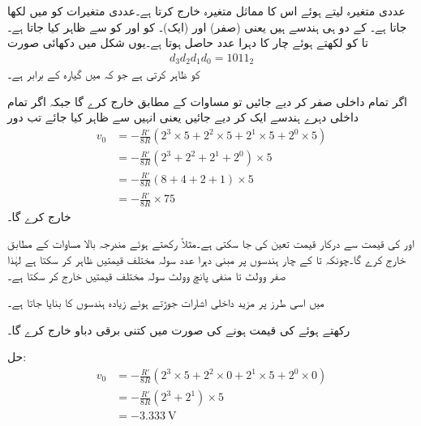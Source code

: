  عددی متغیرہ لیتے ہوئے اس کا مماثل متغیرہ خارج کرتا ہے۔عددی متغیرات کو   میں لکھا جاتا ہے۔ کے دو ہی ہندسے ہیں یعنی  (صفر) اور  (ایک)۔ کو  اور  کو  سے ظاہر کیا جاتا ہے۔ تا  کو  لکھتے ہوئے چار  کا دہرا عدد حاصل ہوتا ہے۔یوں شکل میں دکھائی صورت
\begin{align*}
d_3 d_2 d_1 d_0 =1011_2
\end{align*}
کو ظاہر کرتی ہے جو کہ  میں  گیارہ  کے برابر ہے۔

اگر تمام داخلی  صفر کر دیے جائیں تو  مساوات  کے مطابق   خارج کرے گا جبکہ اگر تمام داخلی دہرے ہندسے ایک کر دیے جائیں یعنی انہیں  سے ظاہر کیا جائے تب دور
\begin{align*}
v_0&=-\frac{R'}{8 R} \left(2^3 \times 5+2^2 \times 5+2^1 \times 5+2^0 \times 5 \right)\\
&=-\frac{R'}{8 R} \left(2^3+2^2 +2^1 +2^0  \right) \times 5\\
&=-\frac{R'}{8 R} \left(8+4 +2 +1 \right) \times 5\\
&=-\frac{R'}{8 R}\times 75
\end{align*}  
خارج کرے گا۔

 اور  کی قیمت سے درکار قیمت تعین کی جا سکتی ہے۔مثلاً  رکھتے ہوئے مندرجہ بالا مساوات کے مطابق   خارج کرے گا۔چونکہ  تا  کے چار ہندسوں پر مبنی دہرا عدد سولہ  مختلف قیمتیں ظاہر کر سکتا ہے لہٰذا  صفر وولٹ تا منفی پانچ وولٹ سولہ مختلف قیمتیں خارج کر سکتا ہے۔

 میں اسی طرز پر مزید داخلی اشارات  جوڑتے ہوئے زیادہ ہندسوں کا  بنایا جاتا ہے۔ 

 رکھتے ہوئے  کی قیمت  ہونے کی صورت میں  کتنی برقی دباو خارج کرے گا۔

حل:
\begin{align*}
v_0&=-\frac{R'}{8 R} \left(2^3 \times 5+2^2 \times 0+2^1 \times 5+2^0 \times 0 \right)\\
&=-\frac{R'}{8 R} \left(2^3+2^1  \right) \times 5\\
&=\SI{-3.333}{\volt}
\end{align*}  

